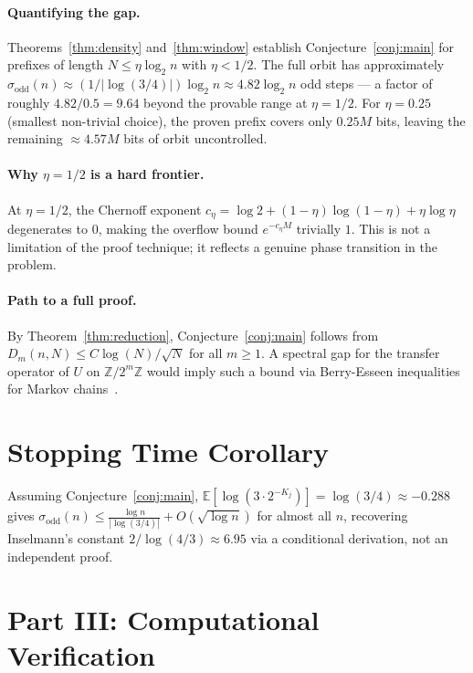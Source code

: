 \documentclass[12pt]{article}
\theoremstyle{definition}
\theoremstyle{remark}
\begin{document}
\paragraph{Quantifying the gap.}
Theorems~\ref{thm:density} and~\ref{thm:window} establish
Conjecture~\ref{conj:main} for prefixes of length $N\leq\eta\log_2 n$
with $\eta<1/2$.
The full orbit has approximately
$\sigma_{\mathrm{odd}}(n)\approx(1/|\log(3/4)|)\log_2 n\approx 4.82\log_2 n$
odd steps --- a factor of roughly $4.82/0.5=9.64$ beyond the
provable range at $\eta=1/2$.
For $\eta=0.25$ (smallest non-trivial choice), the proven prefix covers
only $0.25M$ bits, leaving the remaining $\approx 4.57M$ bits of orbit
uncontrolled.

\paragraph{Why $\eta=1/2$ is a hard frontier.}
At $\eta=1/2$, the Chernoff exponent
$c_\eta=\log 2+(1-\eta)\log(1-\eta)+\eta\log\eta$ degenerates to $0$,
making the overflow bound $e^{-c_\eta M}$ trivially $1$.
This is not a limitation of the proof technique; it reflects a genuine
phase transition in the problem.

\paragraph{Path to a full proof.}
By Theorem~\ref{thm:reduction}, Conjecture~\ref{conj:main} follows from
$D_m(n,N)\leq C\log(N)/\sqrt{N}$ for all $m\geq 1$.
A spectral gap for the transfer operator of $U$ on
$\mathbb{Z}/2^m\mathbb{Z}$ would imply such a bound via
Berry-Esseen inequalities for Markov chains~\cite{Furstenberg1981}.

\section{Stopping Time Corollary}

Assuming Conjecture~\ref{conj:main},
$\mathbb{E}[\log(3\cdot 2^{-K_j})]=\log(3/4)\approx -0.288$
gives $\sigma_{\mathrm{odd}}(n)\leq\frac{\log n}{|\log(3/4)|}+O(\sqrt{\log n})$
for almost all $n$, recovering Inselmann's constant $2/\log(4/3)\approx 6.95$
via a conditional derivation, not an independent proof.

\section{Part III: Computational Verification}\label{sec:computation}
\end{document}
